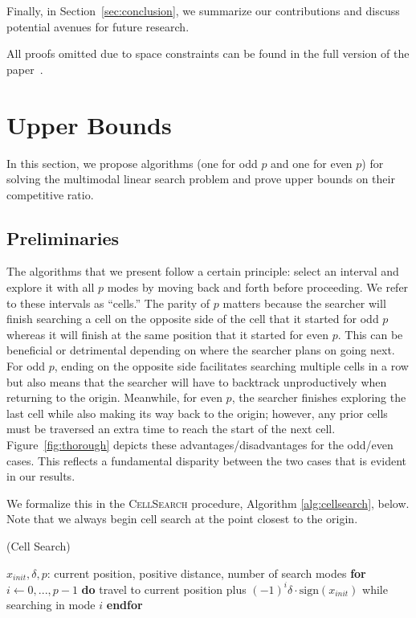 Finally, in Section~\ref{sec:conclusion}, we summarize our contributions and discuss potential avenues for future research.
\begin{mainonly}
All proofs omitted due to space constraints can be found in the full version of the paper~\cite{full_paper}.
\end{mainonly}

\section{Upper Bounds}

In this section, we propose algorithms  (one for odd $p$  and one for even $p$) for solving the multimodal linear search problem and prove upper bounds on their competitive ratio.

\subsection{Preliminaries}

The algorithms that we present follow a certain principle: select an interval and explore it with all $p$ modes by moving back and forth before proceeding.
We refer to these intervals as ``cells.'' The parity of $p$ matters because the searcher will finish searching a cell on the opposite side of the cell that it started for odd $p$ whereas it will finish at the same position that it started for even $p$. 
This can be beneficial or detrimental depending on where the searcher plans on going next. 
For odd $p$, ending on the opposite side facilitates searching multiple cells in a row but also means that the searcher will have to backtrack unproductively when returning to the origin.
Meanwhile, for even $p$, the searcher finishes exploring the last cell while also making its way back to the origin; however, any prior cells must be traversed an extra time to reach the start of the next cell. 
Figure~\ref{fig:thorough} depicts these advantages/disadvantages for the odd/even cases.
This reflects a fundamental disparity between the two cases that is  evident in our results. 

We formalize this in the \textsc{CellSearch} procedure, Algorithm \ref{alg:cellsearch}, below. Note that we always begin cell search at the point closest to the origin. 

\begin{algorithm}[H]
  \caption{(Cell Search)}
  \begin{algorithmic}[1]
      \Statex $x_{init}, \delta, p$: current position, positive distance, number of search modes 
      \State \textbf{for} $i \gets 0, ..., p-1$ \textbf{do} \Indent
      \State travel to current position plus $(-1)^i\delta\cdot \text{sign}(x_{init})$ while searching in mode $i$\EndIndent
      \State \textbf{endfor}
    \EndProcedure
  \end{algorithmic}
\end{algorithm}

